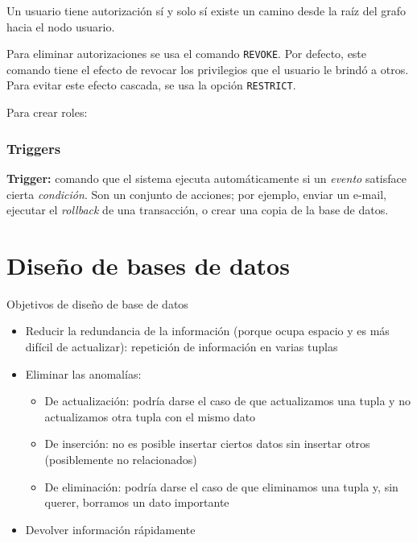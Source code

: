 \documentclass[a4paper, twoside]{article}
\newcommand{\codedir}{../resources/code} %
\begin{document}
Un usuario tiene autorización sí y solo sí existe un camino desde la raíz del grafo hacia el nodo usuario.



Para eliminar autorizaciones se usa el comando \texttt{REVOKE}. Por defecto, este comando tiene el efecto de revocar los privilegios que el usuario le brindó a otros. Para evitar este efecto cascada, se usa la opción \texttt{RESTRICT}.



Para crear roles:


\section{Triggers}
\textbf{Trigger:} comando que el sistema ejecuta automáticamente si un \emph{evento} satisface cierta \emph{condición}. Son un conjunto de acciones; por ejemplo, enviar un e-mail, ejecutar el \emph{rollback} de una transacción, o crear una copia de la base de datos.



\newpage
\part{Diseño de bases de datos}
\begin{definicion}[0.9\textwidth]{Objetivos de diseño de base de datos}
	\begin{itemize}
		\item Reducir la redundancia de la información (porque ocupa espacio y es más difícil de actualizar): repetición de información en varias tuplas
		\item Eliminar las anomalías:
		\begin{itemize}
			\item De actualización: podría darse el caso de que actualizamos una tupla y no actualizamos otra tupla con el mismo dato
			\item De inserción: no es posible insertar ciertos datos sin insertar otros (posiblemente no relacionados)
			\item De eliminación: podría darse el caso de que eliminamos una tupla y, sin querer, borramos un dato importante
		\end{itemize}
		\item Devolver información rápidamente
	\end{itemize}
\end{definicion}
\end{document}
